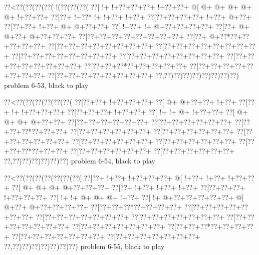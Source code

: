 \vbox{\vbox{\goo
\0??<\0??(\0??(\0??(\0??(\- !(\0??(\0??(\0??(
\0??[\- !+\- !+\0??+\0??+\0??+\- !+\0??+\0??+
\- @[\- @+\- @+\- @+\- @+\- @+\- !+\0??+\0??+
\0??[\0??+\- !+\0??*\- !+\- !+\0??+\- !+\0??+
\0??[\0??+\0??+\0??+\0??+\- !+\0??+\- @+\0??+
\0??[\0??+\0??+\- !+\0??+\- @+\- @+\0??+\0??+
\0??[\- !+\0??+\- !+\- @+\0??+\0??+\0??+\0??+
\0??[\0??+\- @+\- @+\0??+\- @+\0??+\0??+\0??+
\0??[\0??+\0??+\0??+\0??+\0??+\0??+\0??+\0??+
\0??[\0??+\- @+\0??*\0??+\0??+\0??+\0??+\0??+
\0??[\0??+\0??+\0??+\0??+\0??+\0??+\0??+\0??+
\0??[\0??+\0??+\0??+\0??+\0??+\0??+\0??+\0??+
\0??[\0??+\0??+\0??+\0??+\0??+\0??+\0??+\0??+
\0??[\0??+\0??+\0??+\0??+\0??+\0??+\0??+\0??+
\0??[\0??+\0??+\0??+\0??+\0??+\0??+\0??+\0??+
\0??[\0??+\0??+\0??*\0??+\0??+\0??+\0??+\0??+
\0??[\0??+\0??+\0??+\0??+\0??+\0??+\0??+\0??+
\0??[\0??+\0??+\0??+\0??+\0??+\0??+\0??+\0??+
\0??,\0??)\0??)\0??)\0??)\0??)\0??)\0??)\0??)
}
\hfil problem 6-53, black to play\hfil\break
}

\vbox{\vbox{\goo
\0??<\0??(\0??(\0??(\0??(\0??(\0??(
\0??[\0??+\0??+\- !+\0??+\0??+\0??+
\0??[\- @+\- @+\0??+\0??+\- !+\0??+
\0??[\0??+\- !+\- !+\0??+\0??+\0??+
\0??[\0??+\0??+\0??+\- !+\0??+\0??+
\0??[\- !+\- !+\- @+\- !+\0??+\0??+
\0??[\- @+\- @+\- @+\- @+\0??+\0??+
\0??[\0??+\0??+\0??+\0??+\0??+\0??+
\0??[\0??+\0??+\0??+\0??+\0??+\0??+
\0??[\0??+\0??+\0??*\0??+\0??+\0??+
\0??[\0??+\0??+\0??+\0??+\0??+\0??+
\0??[\0??+\0??+\0??+\0??+\0??+\0??+
\0??[\0??+\0??+\0??+\0??+\0??+\0??+
\0??[\0??+\0??+\0??+\0??+\0??+\0??+
\0??[\0??+\0??+\0??+\0??+\0??+\0??+
\0??[\0??+\0??+\0??*\0??+\0??+\0??+
\0??[\0??+\0??+\0??+\0??+\0??+\0??+
\0??[\0??+\0??+\0??+\0??+\0??+\0??+
\0??,\0??)\0??)\0??)\0??)\0??)\0??)
}
\hfil problem 6-54, black to play\hfil\break
}

\vbox{\vbox{\goo
\0??<\0??(\0??(\0??(\0??(\0??(\0??(\0??(
\0??[\0??+\- !+\0??+\- !+\0??+\0??+\0??+
\- @[\- !+\0??+\- !+\0??+\- !+\0??+\0??+
\0??[\- @+\- @+\- @+\- @+\0??+\0??+\0??+
\0??[\0??+\- !+\0??+\- !+\0??+\- !+\0??+
\0??[\0??+\0??+\0??+\- !+\0??+\0??+\0??+
\0??[\- !+\- !+\- @+\- @+\- @+\- !+\0??+
\0??[\- !+\- @+\0??+\0??+\0??+\0??+\0??+
\- @[\- @+\0??+\- @+\0??+\0??+\0??+\0??+
\0??[\0??+\0??+\0??*\0??+\0??+\0??+\0??+
\0??[\0??+\0??+\0??+\0??+\0??+\0??+\0??+
\0??[\0??+\0??+\0??+\0??+\0??+\0??+\0??+
\0??[\0??+\0??+\0??+\0??+\0??+\0??+\0??+
\0??[\0??+\0??+\0??+\0??+\0??+\0??+\0??+
\0??[\0??+\0??+\0??+\0??+\0??+\0??+\0??+
\0??[\0??+\0??+\0??*\0??+\0??+\0??+\0??+
\0??[\0??+\0??+\0??+\0??+\0??+\0??+\0??+
\0??[\0??+\0??+\0??+\0??+\0??+\0??+\0??+
\0??,\0??)\0??)\0??)\0??)\0??)\0??)\0??)
}
\hfil problem 6-55, black to play\hfil\break
}

